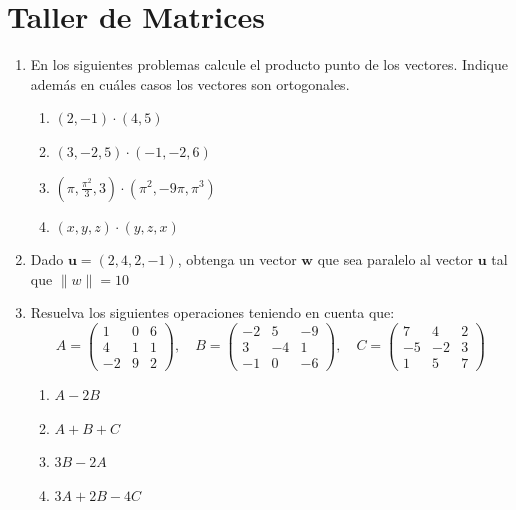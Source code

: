 \documentclass[12pt,letterpaper]{article}
\begin{document}
\section*{Taller de Matrices}

\begin{enumerate}

    
    \item En los siguientes problemas calcule el producto punto de los vectores. Indique además en cuáles casos los vectores son ortogonales.

    \begin{enumerate}
        \item $(2, -1) \cdot (4, 5)$
        \item $(3,-2,5) \cdot (-1,-2,6)$
        \item $(\pi, \frac{\pi^2}{3}, 3) \cdot (\pi^2, -9\pi, \pi^3)$
        \item $(x, y, z) \cdot (y, z, x)$
    \end{enumerate}


    \item Dado $\mathbf{u}=(2,4,2,-1)$, obtenga un vector $\mathbf{w}$ que sea paralelo al vector $\mathbf{u}$ tal que $\|w\|=10$
    
    
    \item Resuelva los siguientes operaciones teniendo en cuenta que: 
    \[
    A = \begin{pmatrix} 1 & 0 & 6\\4 & 1 & 1 \\ -2 & 9 & 2 \end{pmatrix},
    \quad 
    B = \begin{pmatrix} -2 & 5 & -9\\3 & -4 & 1 \\ -1 & 0 & -6 \end{pmatrix},
    \quad
    C = \begin{pmatrix} 7 & 4 & 2 \\ -5 & -2 & 3 \\ 1 & 5 & 7     \end{pmatrix}
    \]
    \begin{enumerate}
        \item $A-2B$
        \item $A+B+C$
        \item $3B-2A$
        \item $3A+2B-4C$
    \end{enumerate}
    

\end{enumerate}
\end{document}

